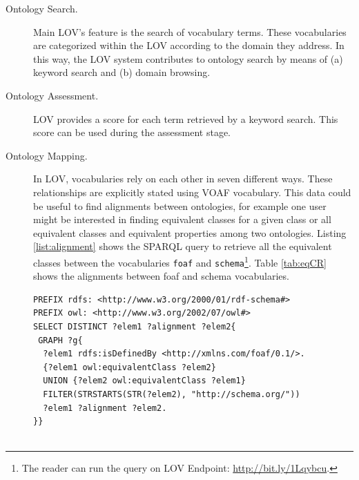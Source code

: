 \documentclass{iosart2c}
\begin{document}
\begin{description}

 \item [Ontology Search.] Main LOV's feature is the search of vocabulary terms. These vocabularies are categorized within the LOV according to the domain they address. In this way, the LOV system contributes to ontology search by means of (a) keyword search and (b) domain browsing.
 \item [Ontology Assessment.] LOV provides a score for each term retrieved by a keyword search. This score can be used during the assessment stage.
 \item [Ontology Mapping.] In LOV, vocabularies rely on each other in seven different ways. These relationships are explicitly stated using VOAF vocabulary. This data could be useful to find alignments between ontologies, for example one user might be interested in finding equivalent classes for a given class or all equivalent classes and equivalent properties among two ontologies. Listing \ref{list:alignment} shows the SPARQL query to retrieve all the equivalent classes between the vocabularies \texttt{foaf} and \texttt{schema}\footnote{The reader can run the query on LOV Endpoint: \url{http://bit.ly/1Lqybcu}.}. Table \ref{tab:eqCR} shows the alignments between foaf and schema vocabularies.
     
 \begin{lstlisting}[basicstyle=\tiny,float=htb,caption={SPARQL query asking for all the equivalent classes and properties between the vocabularies foaf and schema.},label=list:alignment, language=turtle]
PREFIX rdfs: <http://www.w3.org/2000/01/rdf-schema#>
PREFIX owl: <http://www.w3.org/2002/07/owl#>
SELECT DISTINCT ?elem1 ?alignment ?elem2{
 GRAPH ?g{
  ?elem1 rdfs:isDefinedBy <http://xmlns.com/foaf/0.1/>.
  {?elem1 owl:equivalentClass ?elem2}
  UNION {?elem2 owl:equivalentClass ?elem1}
  FILTER(STRSTARTS(STR(?elem2), "http://schema.org/"))
  ?elem1 ?alignment ?elem2.
}}
	
	\end{lstlisting}
	


 \begin{table}[h!tb]
\caption{Equivalent classes and properties between foaf and schema.}
\label{tab:eqCR}
\end{table}
    

\end{description}
\end{document}
